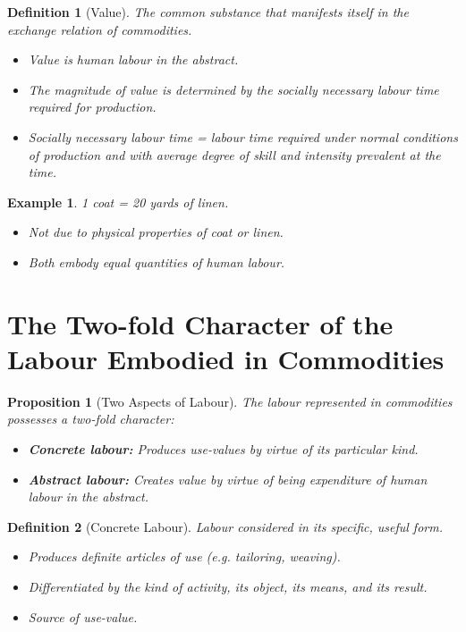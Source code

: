 \documentclass{article}
\newtheorem{definition}{Definition}[section]
\newtheorem{proposition}{Proposition}[section]
\newtheorem{example}{Example}[section]
\begin{document}
\begin{definition}[Value]\label{def:1.1.1.3}
The common substance that manifests itself in the exchange relation of commodities.
\begin{itemize}[noitemsep]
  \item Value is human labour in the abstract.
  \item The magnitude of value is determined by the socially necessary labour time required for production.
  \item Socially necessary labour time = labour time required under normal conditions of production and with average degree of skill and intensity prevalent at the time.
\end{itemize}
\end{definition}

\begin{example}
1 coat = 20 yards of linen.
\begin{itemize}[noitemsep]
  \item Not due to physical properties of coat or linen.
  \item Both embody equal quantities of human labour.
\end{itemize}
\end{example}

\newpage

\section{The Two-fold Character of the Labour Embodied in Commodities}

\begin{proposition}[Two Aspects of Labour]\label{prop:1.1.2.1}
The labour represented in commodities possesses a two-fold character:
\begin{itemize}[noitemsep]
  \item \textbf{Concrete labour:} Produces use-values by virtue of its particular kind.
  \item \textbf{Abstract labour:} Creates value by virtue of being expenditure of human labour in the abstract.
\end{itemize}
\end{proposition}

\begin{definition}[Concrete Labour]\label{def:1.1.2.1}
Labour considered in its specific, useful form.
\begin{itemize}[noitemsep]
  \item Produces definite articles of use (e.g. tailoring, weaving).
  \item Differentiated by the kind of activity, its object, its means, and its result.
  \item Source of use-value.
\end{itemize}
\end{definition}
\end{document}
